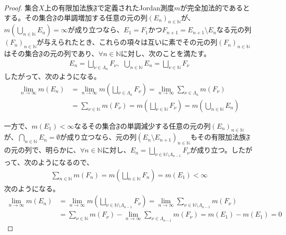 \documentclass[dvipdfmx]{jsarticle}
\begin{document}
\begin{proof}
集合$X$上の有限加法族$\mathfrak{F}$で定義されたJordan測度$m$が完全加法的であるとする。その集合$\mathfrak{F}$の単調増加する任意の元の列$\left( E_{n} \right)_{n \in \mathbb{N}}$が、$m\left( \bigcup_{n \in \mathbb{N}} E_{n} \right) = \infty$が成り立つなら、$E_{1} = F_{1}$かつ$F_{n + 1} = E_{n + 1} \setminus E_{n}$なる元の列$\left( F_{n} \right)_{n \in \mathbb{N}}$が与えられたとき、これらの項々は互いに素でその元の列$\left( F_{n} \right)_{n \in \mathbb{N}}$はその集合$\mathfrak{F}$の元の列であり、$\forall n \in \mathbb{N}$に対し、次のことを満たす。
\begin{align*}
E_{n} = \bigsqcup_{\nu \in \varLambda_{n}} F_{\nu},\ \ \bigcup_{n \in \mathbb{N}} E_{n} = \bigsqcup_{\nu \in \mathbb{N}} F_{\nu}
\end{align*}
したがって、次のようになる。
\begin{align*}
\lim_{n \rightarrow \infty}{m\left( E_{n} \right)} &= \lim_{n \rightarrow \infty}{m\left( \bigsqcup_{\nu \in \varLambda_{n}} F_{\nu} \right)} = \lim_{n \rightarrow \infty}{\sum_{\nu \in \varLambda_{n}} {m\left( F_{\nu} \right)}}\\
&= \sum_{\nu \in \mathbb{N}} {m\left( F_{\nu} \right)} = m\left( \bigsqcup_{\nu \in \mathbb{N}} F_{\nu} \right) = m\left( \bigcup_{n \in \mathbb{N}} E_{n} \right)
\end{align*}\par
一方で、$m\left( E_{1} \right) < \infty$なるその集合$\mathfrak{F}$の単調減少する任意の元の列$\left( E_{n} \right)_{n \in \mathbb{N}}$が、$\bigcap_{n \in \mathbb{N}} E_{n} = \emptyset$が成り立つなら、元の列$\left( E_{n} \setminus E_{n + 1} \right)_{n \in \mathbb{N}}$もその有限加法族$\mathfrak{F}$の元の列で、明らかに、$\forall n \in \mathbb{N}$に対し、$E_{n} = \bigsqcup_{\nu \in \mathbb{N} \setminus \varLambda_{n - 1}} F_{\nu}$が成り立つ。したがって、次のようになるので、
\begin{align*}
\sum_{n \in \mathbb{N}} {m\left( F_{n} \right)} = m\left( \bigsqcup_{n \in \mathbb{N}} F_{n} \right) = m\left( E_{1} \right) < \infty
\end{align*}
次のようになる。
\begin{align*}
\lim_{n \rightarrow \infty}{m\left( E_{n} \right)} &= \lim_{n \rightarrow \infty}{m\left( \bigsqcup_{\nu \in \mathbb{N} \setminus \varLambda_{n - 1}} F_{\nu} \right)} = \lim_{n \rightarrow \infty}{\sum_{\nu \in \mathbb{N} \setminus \varLambda_{n - 1}} {m\left( F_{\nu} \right)}}\\
&= \sum_{\nu \in \mathbb{N}} {m\left( F_{\nu} \right)} - \lim_{n \rightarrow \infty}{\sum_{\nu \in \varLambda_{n - 1}} {m\left( F_{\nu} \right)}} = m\left( E_{1} \right) - m\left( E_{1} \right) = 0

\end{align*}
\end{proof}
\end{document}
